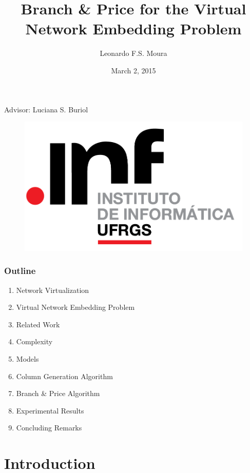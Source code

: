 \documentclass[english]{beamer}
\title{Branch \& Price for the Virtual Network Embedding Problem}
\author{Leonardo F.S. Moura}
\date{March 2, 2015}
\begin{document}
\begin{frame}
\titlepage

\begin{center}
\scriptsize
Advisor: Luciana S. Buriol
\begin{figure}
    \centering
    \includegraphics[scale=0.4]{inf.png}
\end{figure}
\end{center}
\end{frame}

\begin{frame}
  \frametitle{Outline}
\begin{enumerate}
  \item Network Virtualization
  \item Virtual Network Embedding Problem
  \item Related Work
  \item Complexity
  \item Models
  \item Column Generation Algorithm
  \item Branch \& Price Algorithm
  \item Experimental Results
  \item Concluding Remarks
\end{enumerate}
\end{frame}
\section{Introduction}
\end{document}
